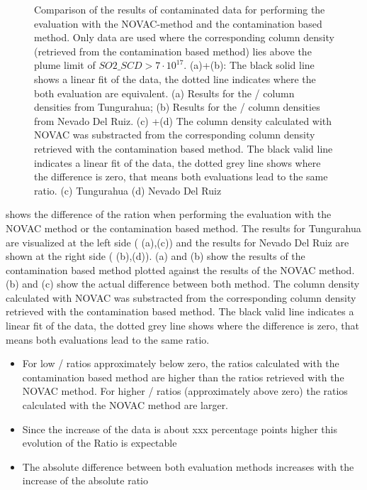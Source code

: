 \documentclass  [
  paper    = a4,
  BCOR     = 10mm,
  twoside,
  fontsize = 12pt,
  fleqn,
  toc      = bibnumbered,
  toc      = listofnumbered,
  numbers  = noendperiod,
  headings = normal,
  listof   = leveldown,
  version  = 3.03
]                                       {scrreprt}
\begin{document}
\begin{figure}[h!]
	\caption{Comparison of the results of contaminated data for performing the evaluation with the NOVAC-method and the contamination based method. Only data are used where the corresponding   column density (retrieved from the contamination based method) lies above the plume limit of $SO2\_SCD>7\cdot 10^{17}$. (a)+(b): The black solid line shows a linear fit of the data, the dotted line indicates where the both evaluation are equivalent. (a) Results for the   /  column densities from Tungurahua; (b) Results for the   /  column densities from Nevado Del Ruiz. 
	(c) +(d) The column density calculated with NOVAC was substracted from the corresponding column density retrieved with the contamination based method. The black valid line indicates a linear fit of the data, the dotted grey line shows where the difference is zero, that means both evaluations lead to the same ratio. (c) Tungurahua (d) Nevado Del Ruiz}
	\label{fig:diffratio}
\end{figure}
 shows the difference of the ration when performing the evaluation with the NOVAC method or the contamination based method. The results for Tungurahua are visualized at the left side ( (a),(c)) and the results for Nevado Del Ruiz are shown at the right side  ( (b),(d)).  (a) and (b) show the results of the contamination based method plotted against the results of the NOVAC method.  (b) and (c) show the actual difference between both method. The column density calculated with NOVAC was substracted from the corresponding column density retrieved with the contamination based method. The black valid line indicates a linear fit of the data, the dotted grey line shows where the difference is zero, that means both evaluations lead to the same ratio.\\
\begin{itemize}
	\item For low /  ratios approximately below zero, the ratios calculated with the contamination based method are higher than the ratios retrieved with the NOVAC method. For higher /  ratios (approximately above zero) the ratios calculated with the NOVAC method are larger.
	\item Since the increase of the   data is about xxx percentage points higher this evolution of the Ratio is expectable
	\item The absolute difference between both evaluation methods increases with the increase of the absolute ratio
\end{itemize}
\end{document}

